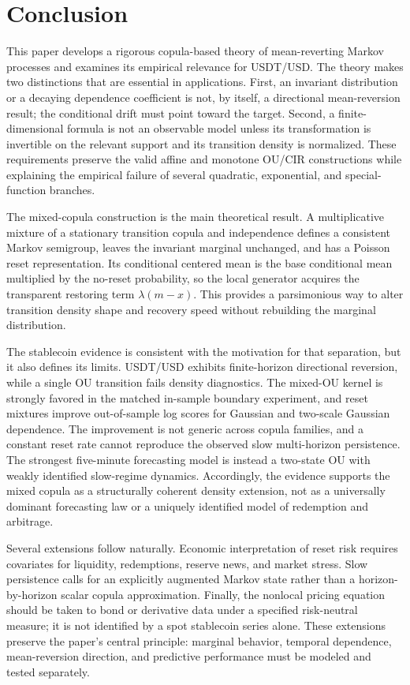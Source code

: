 \section{Conclusion}
\label{sec:conclusion}

This paper develops a rigorous copula-based theory of mean-reverting Markov
processes and examines its empirical relevance for USDT/USD.  The theory makes
two distinctions that are essential in applications.  First, an invariant
distribution or a decaying dependence coefficient is not, by itself, a
directional mean-reversion result; the conditional drift must point toward the
target.  Second, a finite-dimensional formula is not an observable model unless
its transformation is invertible on the relevant support and its transition
density is normalized.  These requirements preserve the valid affine and
monotone OU/CIR constructions while explaining the empirical failure of several
quadratic, exponential, and special-function branches.

The mixed-copula construction is the main theoretical result.  A multiplicative
mixture of a stationary transition copula and independence defines a consistent
Markov semigroup, leaves the invariant marginal unchanged, and has a Poisson
reset representation.  Its conditional centered mean is the base conditional
mean multiplied by the no-reset probability, so the local generator acquires
the transparent restoring term $\lambda(m-x)$.  This provides a parsimonious
way to alter transition density shape and recovery speed without rebuilding the
marginal distribution.

The stablecoin evidence is consistent with the motivation for that separation,
but it also defines its limits.  USDT/USD exhibits finite-horizon directional
reversion, while a single OU transition fails density diagnostics.  The mixed-OU
kernel is strongly favored in the matched in-sample boundary experiment, and
reset mixtures improve out-of-sample log scores for Gaussian and two-scale
Gaussian dependence.  The improvement is not generic across copula families,
and a constant reset rate cannot reproduce the observed slow multi-horizon
persistence.  The strongest five-minute forecasting model is instead a
two-state OU with weakly identified slow-regime dynamics.  Accordingly, the
evidence supports the mixed copula as a structurally coherent density extension,
not as a universally dominant forecasting law or a uniquely identified model of
redemption and arbitrage.

Several extensions follow naturally.  Economic interpretation of reset risk
requires covariates for liquidity, redemptions, reserve news, and market stress.
Slow persistence calls for an explicitly augmented Markov state rather than a
horizon-by-horizon scalar copula approximation.  Finally, the nonlocal pricing
equation should be taken to bond or derivative data under a specified
risk-neutral measure; it is not identified by a spot stablecoin series alone.
These extensions preserve the paper's central principle: marginal behavior,
temporal dependence, mean-reversion direction, and predictive performance must
be modeled and tested separately.
